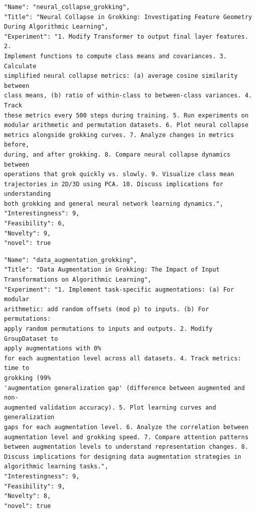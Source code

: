\documentclass[11pt, a4paper]{include/gdm_format}
\begin{document}
\begin{tcolorbox}[breakable,colback=blue!5!white, colframe=blue!75!black, title=Idea 27/50 - \texttt{neural\_collapse\_grokking}]
\small
\begin{verbatim}
"Name": "neural_collapse_grokking",
"Title": "Neural Collapse in Grokking: Investigating Feature Geometry
During Algorithmic Learning",
"Experiment": "1. Modify Transformer to output final layer features. 2.
Implement functions to compute class means and covariances. 3. Calculate
simplified neural collapse metrics: (a) average cosine similarity between
class means, (b) ratio of within-class to between-class variances. 4. Track
these metrics every 500 steps during training. 5. Run experiments on
modular arithmetic and permutation datasets. 6. Plot neural collapse
metrics alongside grokking curves. 7. Analyze changes in metrics before,
during, and after grokking. 8. Compare neural collapse dynamics between
operations that grok quickly vs. slowly. 9. Visualize class mean
trajectories in 2D/3D using PCA. 10. Discuss implications for understanding
both grokking and general neural network learning dynamics.",
"Interestingness": 9,
"Feasibility": 6,
"Novelty": 9,
"novel": true
\end{verbatim}
\end{tcolorbox}

\begin{tcolorbox}[breakable,colback=blue!5!white, colframe=blue!75!black, title=Idea 28/50 - \texttt{data\_augmentation\_grokking}]
\small
\begin{verbatim}
"Name": "data_augmentation_grokking",
"Title": "Data Augmentation in Grokking: The Impact of Input
Transformations on Algorithmic Learning",
"Experiment": "1. Implement task-specific augmentations: (a) For modular
arithmetic: add random offsets (mod p) to inputs. (b) For permutations:
apply random permutations to inputs and outputs. 2. Modify GroupDataset to
apply augmentations with 0%
for each augmentation level across all datasets. 4. Track metrics: time to
grokking (99%
'augmentation generalization gap' (difference between augmented and non-
augmented validation accuracy). 5. Plot learning curves and generalization
gaps for each augmentation level. 6. Analyze the correlation between
augmentation level and grokking speed. 7. Compare attention patterns
between augmentation levels to understand representation changes. 8.
Discuss implications for designing data augmentation strategies in
algorithmic learning tasks.",
"Interestingness": 9,
"Feasibility": 9,
"Novelty": 8,
"novel": true
\end{verbatim}
\end{tcolorbox}
\end{document}
